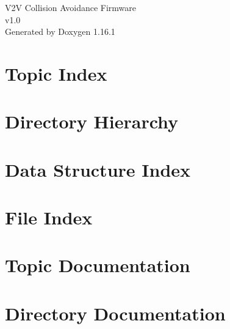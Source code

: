 \documentclass[twoside]{book}
\newcommand{\+}{\discretionary{\mbox{\scriptsize$\hookleftarrow$}}{}{}}
\newcommand{\clearemptydoublepage}{%
    \newpage{\pagestyle{empty}\cleardoublepage}%
  }
\begin{document}
  \raggedbottom
    \hypersetup{pageanchor=false,
                bookmarksnumbered=true,
                pdfencoding=unicode
               }
  \begin{titlepage}
  \vspace*{7cm}
  \begin{center}%
  {\Large V2\+V Collision Avoidance Firmware}\\
  [1ex]\large v1.\+0 \\
  \vspace*{1cm}
  {\large Generated by Doxygen 1.16.1}\\
  \end{center}
  \end{titlepage}
  \clearemptydoublepage
  \tableofcontents
  \clearemptydoublepage
  \hypersetup{pageanchor=true}



\chapter{Topic Index}

\chapter{Directory Hierarchy}

\chapter{Data Structure Index}

\chapter{File Index}

\chapter{Topic Documentation}










\chapter{Directory Documentation}


\end{document}
